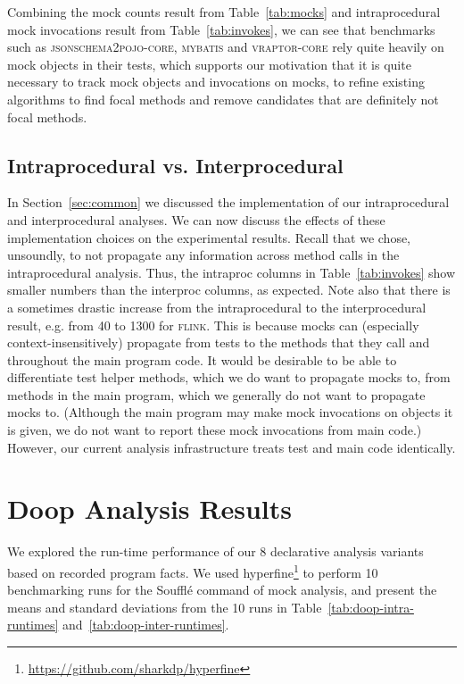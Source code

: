 Combining the mock counts result from Table~\ref{tab:mocks} and intraprocedural mock invocations result from Table~\ref{tab:invokes}, we can see that benchmarks such as \textsc{jsonschema2pojo-core}, \textsc{mybatis} and \textsc{vraptor-core} rely quite heavily on mock objects in their tests, which supports our motivation that it is quite necessary to track mock objects and invocations on mocks, to refine existing algorithms to find focal methods and remove candidates that are definitely not focal methods. 


\subsection{Intraprocedural vs. Interprocedural}

In Section~\ref{sec:common} we discussed the implementation of our intraprocedural and interprocedural analyses. We can now discuss the effects of these implementation choices on the experimental results. Recall that we chose, unsoundly, to not propagate any information across method calls in the intraprocedural analysis. Thus, the intraproc columns in Table~\ref{tab:invokes} show smaller numbers than the interproc columns, as expected. Note also that there is a sometimes drastic increase from the intraprocedural to the interprocedural result, e.g. from 40 to 1300 for \textsc{flink}. This is because mocks can (especially context-insensitively) propagate from tests to the methods that they call and throughout the main program code. It would be desirable to be able to differentiate test helper methods, which we do want to propagate mocks to, from methods in the main program, which we generally do not want to propagate mocks to. (Although the main program may make mock invocations on objects it is given, we do not want to report these mock invocations from main code.) However, our current analysis infrastructure treats test and main code identically.

\section{Doop Analysis Results}

We explored the run-time performance of our 8 declarative analysis variants based on recorded program facts. We used hyperfine\footnote{\url{https://github.com/sharkdp/hyperfine}} to perform 10 benchmarking runs for the Soufflé command of mock analysis, and present the means and standard deviations from the 10 runs in Table~\ref{tab:doop-intra-runtimes} and~\ref{tab:doop-inter-runtimes}.

